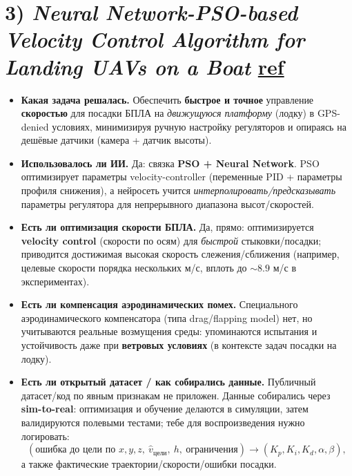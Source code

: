 \section*{3) \textit{Neural Network-PSO-based Velocity Control Algorithm for Landing UAVs on a Boat} \href{https://arxiv.org/pdf/2309.13679}{ref}}
\begin{itemize}
  \item \textbf{Какая задача решалась.}
  Обеспечить \textbf{быстрое и точное} управление \textbf{скоростью} для посадки БПЛА на \emph{движущуюся платформу} (лодку) в GPS-denied условиях, минимизируя ручную настройку регуляторов и опираясь на дешёвые датчики (камера + датчик высоты).

  \item \textbf{Использовалось ли ИИ.}
  Да: связка \textbf{PSO + Neural Network}.
  PSO оптимизирует параметры velocity-controller (переменные PID + параметры профиля снижения), а нейросеть учится \emph{интерполировать/предсказывать} параметры регулятора для непрерывного диапазона высот/скоростей.

  \item \textbf{Есть ли оптимизация скорости БПЛА.}
  Да, прямо: оптимизируется \textbf{velocity control} (скорости по осям) для \emph{быстрой} стыковки/посадки; приводится достижимая высокая скорость слежения/сближения (например, целевые скорости порядка нескольких м/с, вплоть до $\sim 8.9$ м/с в экспериментах).

  \item \textbf{Есть ли компенсация аэродинамических помех.}
  Специального аэродинамического компенсатора (типа drag/flapping model) нет, но учитываются реальные возмущения среды: упоминаются испытания и устойчивость даже при \textbf{ветровых условиях} (в контексте задач посадки на лодку).

  \item \textbf{Есть ли открытый датасет / как собирались данные.}
  Публичный датасет/код по явным признакам не приложен.
  Данные собирались через \textbf{sim-to-real}: оптимизация и обучение делаются в симуляции, затем валидируются полевыми тестами; тебе для воспроизведения нужно логировать:
  \[
    (\text{ошибка до цели по } x,y,z,\ \hat{v}_\text{цели},\ h,\ \text{ограничения}) \to (K_p,K_i,K_d,\alpha,\beta),
  \]
  а также фактические траектории/скорости/ошибки посадки.
\end{itemize}

